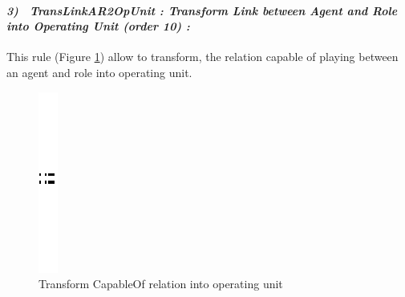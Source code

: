 \vspace{1cm}

\paragraph{\emph{3)~ TransLinkAR2OpUnit : Transform Link between Agent and Role into Operating Unit (order 10) :} } This rule (Figure \ref{fig:Operating Unit for every link capable of playing}) allow to transform, the relation capable of playing between an agent and role  into operating unit.
\vspace{1cm}
\begin{figure}[th]
	\centering
	\quad{}
		\includegraphics{ch3/img/sep}
	\quad{}
\caption{\label{fig:Operating Unit for every link capable of playing}Transform CapableOf relation into operating unit} 
\end{figure}
\pagebreak

